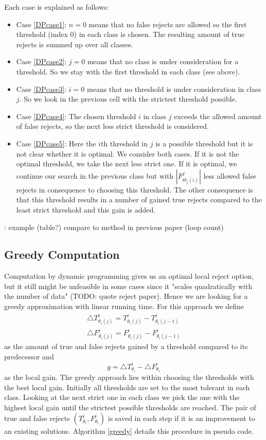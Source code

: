 Each case is explained as follows:
\begin{itemize}
\item Case \ref{DPcase1}: $n=0$ means that no false rejects are allowed so the first threshold (index 0) in each class is chosen. The resulting amount of true rejects is summed up over all classes.
\item Case \ref{DPcase2}: $j=0$ means that no class is under consideration for a threshold. So we stay with the first threshold in each class (see above). 
\item Case \ref{DPcase3}: $i=0$ means that no threshold is under consideration in class $j$. So we look in the previous cell with the strictest threshold possible.
\item Case \ref{DPcase4}: The chosen threshold $i$ in class $j$ exceeds the allowed amount of false rejects, so the next less strict threshold is considered.
\item Case \ref{DPcase5}: Here the $i$th threshold in $j$ is a possible threshold but it is not clear whether it is optimal. We consider both cases. If it is not the optimal threshold, we take the next less strict one. If it is optimal, we continue our search in the previous class but with $|F_{\Theta_j(i)}^j|$ less allowed false rejects in consequence to choosing this threshold. The other consequence is that this threshold results in a number of gained true rejects compared to the least strict threshold and this gain is added.
\end{itemize}
\TODO: example (table?) compare to method in previous paper (loop count)

\subsection{Greedy Computation}
\label{greedyAlg}
Computation by dynamic programming gives us an optimal local reject option, but it still might be unfeasible in some cases since it "scales quadratically with the number of data" (TODO: quote reject paper). Hence we are looking for a greedy approximation with linear running time. For this approach we define
\begin{align}
 	\bigtriangleup T_{\theta_i(j)}^i = T_{\theta_i(j)}^i-T_{\theta_i(j-1)}^i \\
	\bigtriangleup F_{\theta_i(j)}^i = F_{\theta_i(j)}^i-F_{\theta_i(j-1)}^i
\end{align}
as the amount of true and false rejects gained by a threshold compared to its predecessor and
$$ g = \bigtriangleup T_{\theta_i}^i - \bigtriangleup F_{\theta_i}^i $$
as the local gain. The greedy approach lies within choosing the thresholds with the best local gain. Initially all thresholds are set to the most tolerant in each class. Looking at the next strict one in each class we pick the one with the highest local gain until the strictest possible thresholds are reached. The pair of true and false rejects $\left(T_{\theta_i}^i,F_{\theta_i}^i\right)$ is saved in each step if it is an improvement to an existing solutions. Algorithm \ref{greedy} details this procedure in pseudo code. 

